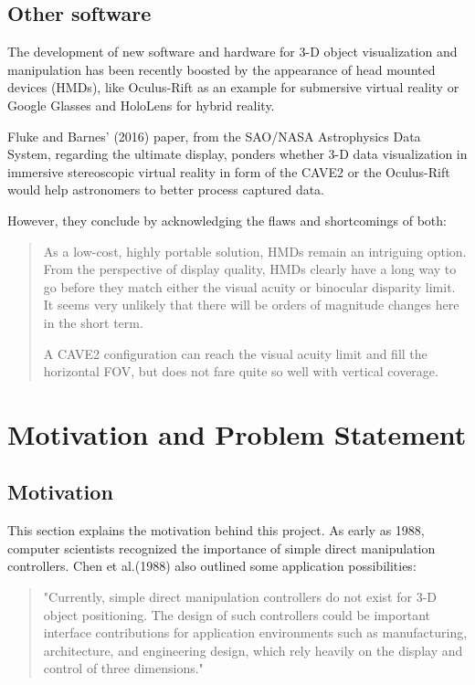\documentclass[12pt]{extarticle}
\begin{document}
\subsection {Other software}
The development of new software and hardware for 3-D object visualization and manipulation has been recently boosted by the appearance of head mounted devices (HMDs), like Oculus-Rift as an example for submersive virtual reality or Google Glasses and HoloLens for hybrid reality.

Fluke and Barnes' (2016)\cite{NASA} paper, from the SAO/NASA Astrophysics Data System, regarding the ultimate display, ponders whether 3-D data visualization in immersive stereoscopic virtual reality in form of the CAVE2 or the Oculus-Rift would help astronomers to better process captured data.

However, they conclude by acknowledging the flaws and shortcomings of both:
\begin{quotation}
As a low-cost, highly portable solution, HMDs remain an intriguing option. From the perspective of display quality, HMDs clearly have a long way to go before they match either the visual acuity or binocular disparity limit. It seems very unlikely that there will be orders of magnitude changes here in the short term.

A CAVE2 configuration can reach the visual acuity limit and fill the horizontal FOV, but does not fare quite so well with vertical coverage. \cite{NASA}
\end{quotation}

\section{Motivation and Problem Statement}\label{sec:Mot}
\subsection{Motivation}
This section explains the motivation behind this project. As early as 1988, computer scientists recognized the importance of simple direct manipulation controllers. Chen et al.(1988) also outlined some application possibilities:
\begin{quotation}
"Currently, simple direct manipulation controllers do not exist for 3-D object positioning. The design of such controllers could be important interface contributions for application environments such as manufacturing, architecture, and engineering design, which rely heavily on the display and control of three dimensions." \cite{3DOn2D88}
\end{quotation}
\end{document}
